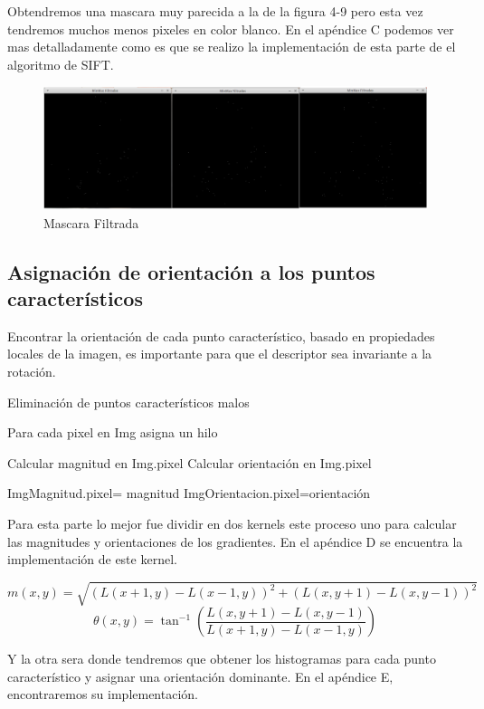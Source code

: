 Obtendremos una mascara muy parecida a la de la figura 4-9 pero esta vez tendremos muchos menos pixeles en color blanco. En el apéndice C podemos ver mas detalladamente como es que se realizo la implementación de esta parte de el algoritmo de SIFT.

\begin{figure}[h]
			\centering
				\includegraphics[scale=0.3]{img/minmax.jpg}
			\caption{Mascara Filtrada}
\end{figure}

\pagebreak

\subsection{Asignación de orientación a los puntos característicos}

Encontrar la orientación de cada punto característico, basado en propiedades locales de la imagen, es importante para que el descriptor sea invariante a la rotación.


\begin{algorithm}[H]
\caption{Eliminación de puntos característicos malos}
 Para cada pixel en Img asigna un hilo\;
 
 {
	Calcular magnitud en Img.pixel\;
	Calcular orientación en Img.pixel\;
	
	ImgMagnitud.pixel= magnitud\;
	ImgOrientacion.pixel=orientación\;
	
}
\end{algorithm}



Para esta parte lo mejor fue dividir en dos kernels este proceso uno para calcular las magnitudes y orientaciones de los gradientes. En el apéndice D se encuentra la implementación de este kernel.

$$m(x,y) = \sqrt{ (L(x+1,y)-L(x-1,y))^2 + (L(x,y+1)-L(x,y-1))^2 }$$		
$$\theta(x,y) =  \tan^{-1} \left(\frac{L(x,y+1)-L(x,y-1)}{L(x+1,y)-L(x-1,y)}\right)$$


Y la otra sera donde tendremos que obtener los histogramas para cada punto característico y asignar una orientación dominante. En el apéndice E, encontraremos su implementación. 


